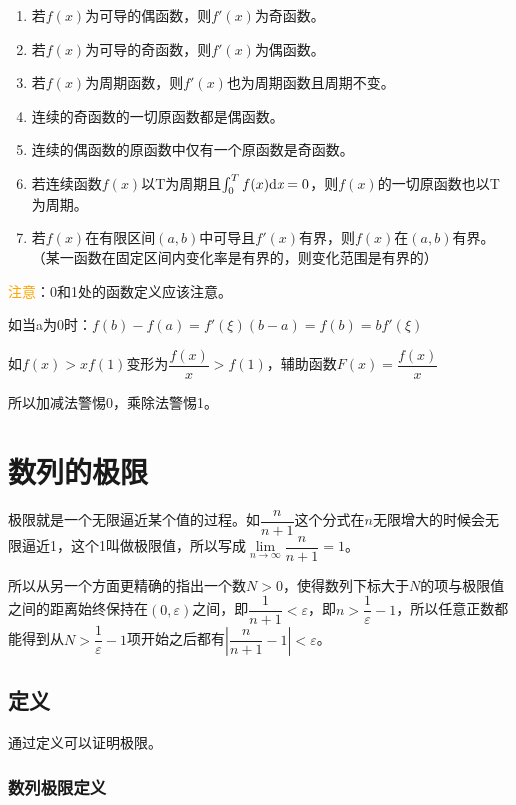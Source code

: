 \documentclass[UTF8, 12pt]{ctexart}
\begin{document}
\begin{enumerate}
    \item 若$f(x)$为可导的偶函数，则$f'(x)$为奇函数。
    \item 若$f(x)$为可导的奇函数，则$f'(x)$为偶函数。
    \item 若$f(x)$为周期函数，则$f'(x)$也为周期函数且周期不变。
    \item 连续的奇函数的一切原函数都是偶函数。
    \item 连续的偶函数的原函数中仅有一个原函数是奇函数。
    \item 若连续函数$f(x)$以T为周期且$\int_{0}^{T}f(x)\rm{d}\textit{x}=0$，则$f(x)$的一切原函数也以T为周期。
    \item 若$f(x)$在有限区间$(a,b)$中可导且$f'(x)$有界，则$f(x)$在$(a,b)$有界。（某一函数在固定区间内变化率是有界的，则变化范围是有界的）
\end{enumerate}

\textcolor{orange}{注意}：0和1处的函数定义应该注意。

如当a为0时：$f(b)-f(a)=f'(\xi )(b-a)=f(b)=bf'(\xi)$

如$f(x)>xf(1)$变形为$\dfrac{f(x)}{x}>f(1)$，辅助函数$F(x)=\dfrac{f(x)}{x}$

所以加减法警惕0，乘除法警惕1。

\section{数列的极限}

极限就是一个无限逼近某个值的过程。如$\dfrac{n}{n+1}$这个分式在$n$无限增大的时候会无限逼近1，这个1叫做极限值，所以写成$\lim\limits_{n\to\infty}\dfrac{n}{n+1}=1$。

所以从另一个方面更精确的指出一个数$N>0$，使得数列下标大于$N$的项与极限值之间的距离始终保持在$(0,\varepsilon)$之间，即$\dfrac{1}{n+1}<\varepsilon$，即$n>\dfrac{1}{\varepsilon}-1$，所以任意正数都能得到从$N>\dfrac{1}{\varepsilon}-1$项开始之后都有$\left\vert\dfrac{n}{n+1}-1\right\vert<\varepsilon$。

\subsection{定义}

通过定义可以证明极限。

\subsubsection{数列极限定义}
\end{document}
